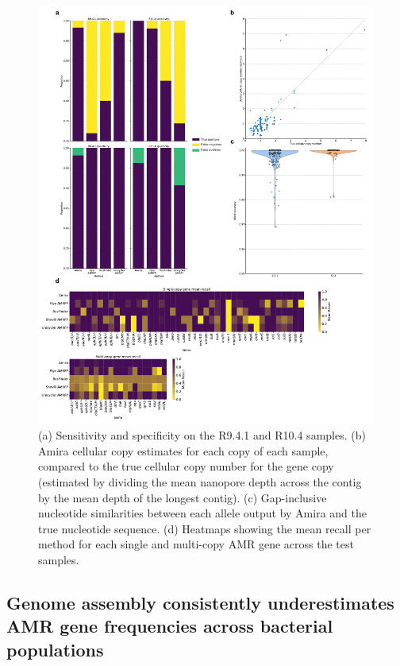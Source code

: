 \begin{figure}
\centering
\includegraphics[width=1\linewidth]{Figures/figure_4.pdf}
\caption{(a) Sensitivity and specificity on the R9.4.1 and R10.4 samples. (b) Amira cellular copy estimates for each copy of each sample, compared to the true cellular copy number for the gene copy (estimated by dividing the mean nanopore depth across the contig by the mean depth of the longest contig). (c) Gap-inclusive nucleotide similarities between each allele output by Amira and the true nucleotide sequence. (d) Heatmaps showing the mean recall per method for each single and multi-copy AMR gene across the test samples.}
\label{fig:4}
\end{figure}

\subsection*{Genome assembly consistently underestimates AMR gene frequencies across bacterial populations}

